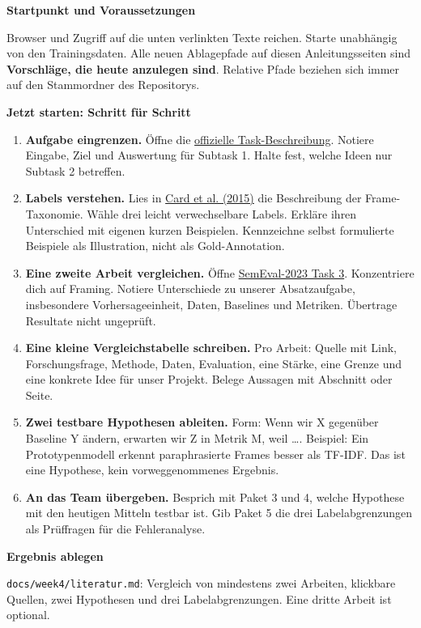 \documentclass[10pt,a4paper]{article}
\newcommand{\checkbox}{\fbox{\rule{0pt}{2.4mm}\hspace{2.4mm}}}
\newcommand{\planheading}[1]{\par\vspace{9pt}\textbf{#1}\par\vspace{3pt}}
\newenvironment{startsteps}{\begin{enumerate}[leftmargin=12mm,label=\checkbox\hspace{2mm}\textbf{\arabic*.},labelsep=2mm,itemsep=7pt,parsep=2pt,topsep=4pt]}{\end{enumerate}}
\begin{document}
\planheading{Startpunkt und Voraussetzungen}
Browser und Zugriff auf die unten verlinkten Texte reichen. Starte unabhängig von den Trainingsdaten.
Alle neuen Ablagepfade auf diesen Anleitungsseiten sind \textbf{Vorschläge, die heute anzulegen sind}.
Relative Pfade beziehen sich immer auf den Stammordner des Repositorys.

\planheading{Jetzt starten: Schritt für Schritt}
\begin{startsteps}
  \item \textbf{Aufgabe eingrenzen.}
    Öffne die \href{https://propaganda.math.unipd.it/semeval2027task9/index.html}{offizielle Task-Beschreibung}.
    Notiere Eingabe, Ziel und Auswertung für Subtask 1. Halte fest, welche Ideen nur Subtask 2 betreffen.
  \item \textbf{Labels verstehen.}
    Lies in \href{https://aclanthology.org/P15-2072/}{Card et al. (2015)} die Beschreibung der Frame-Taxonomie.
    Wähle drei leicht verwechselbare Labels. Erkläre ihren Unterschied mit eigenen kurzen Beispielen.
    Kennzeichne selbst formulierte Beispiele als Illustration, nicht als Gold-Annotation.
  \item \textbf{Eine zweite Arbeit vergleichen.}
    Öffne \href{https://aclanthology.org/2023.semeval-1.317/}{SemEval-2023 Task 3}.
    Konzentriere dich auf Framing. Notiere Unterschiede zu unserer Absatzaufgabe,
    insbesondere Vorhersageeinheit, Daten, Baselines und Metriken. Übertrage Resultate nicht ungeprüft.
  \item \textbf{Eine kleine Vergleichstabelle schreiben.}
    Pro Arbeit: Quelle mit Link, Forschungsfrage, Methode, Daten, Evaluation,
    eine Stärke, eine Grenze und eine konkrete Idee für unser Projekt. Belege Aussagen mit Abschnitt oder Seite.
  \item \textbf{Zwei testbare Hypothesen ableiten.}
    Form: \glqq Wenn wir X gegenüber Baseline Y ändern, erwarten wir Z in Metrik M,
    weil \ldots\grqq{}. Beispiel: Ein Prototypenmodell erkennt paraphrasierte Frames besser als TF-IDF.
    Das ist eine Hypothese, kein vorweggenommenes Ergebnis.
  \item \textbf{An das Team übergeben.}
    Besprich mit Paket 3 und 4, welche Hypothese mit den heutigen Mitteln testbar ist.
    Gib Paket 5 die drei Labelabgrenzungen als Prüffragen für die Fehleranalyse.
\end{startsteps}

\planheading{Ergebnis ablegen}
\texttt{docs/week4/literatur.md}: Vergleich von mindestens zwei Arbeiten, klickbare Quellen,
zwei Hypothesen und drei Labelabgrenzungen. Eine dritte Arbeit ist optional.
\end{document}
